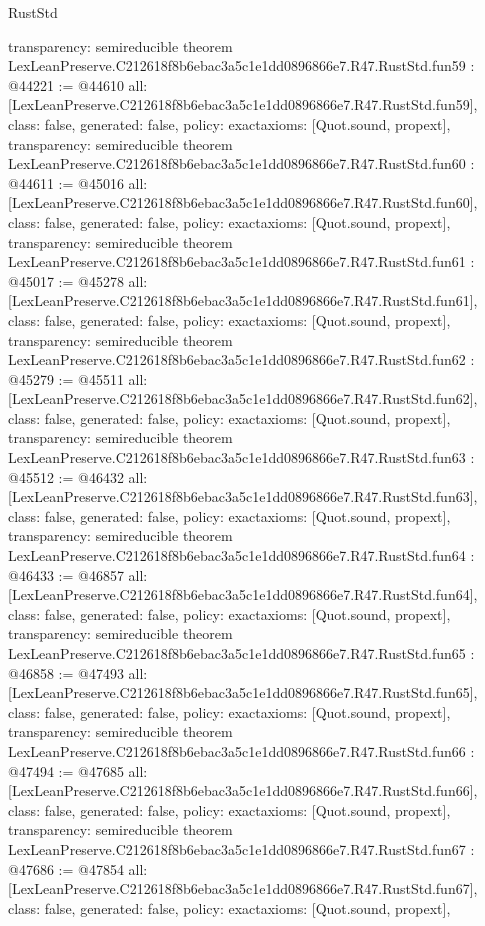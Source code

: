 \begin{lexlean}{RustStd}
\begin{coremodule}
{  transparency: semireducible
}
theorem LexLeanPreserve.C212618f8b6ebac3a5c1e1dd0896866e7.R47.RustStd.fun59 : @44221 := @44610 {
  all: [LexLeanPreserve.C212618f8b6ebac3a5c1e1dd0896866e7.R47.RustStd.fun59],
  class: false,
  generated: false,
  policy: exact{axioms: [Quot.sound, propext]},
  transparency: semireducible
}
theorem LexLeanPreserve.C212618f8b6ebac3a5c1e1dd0896866e7.R47.RustStd.fun60 : @44611 := @45016 {
  all: [LexLeanPreserve.C212618f8b6ebac3a5c1e1dd0896866e7.R47.RustStd.fun60],
  class: false,
  generated: false,
  policy: exact{axioms: [Quot.sound, propext]},
  transparency: semireducible
}
theorem LexLeanPreserve.C212618f8b6ebac3a5c1e1dd0896866e7.R47.RustStd.fun61 : @45017 := @45278 {
  all: [LexLeanPreserve.C212618f8b6ebac3a5c1e1dd0896866e7.R47.RustStd.fun61],
  class: false,
  generated: false,
  policy: exact{axioms: [Quot.sound, propext]},
  transparency: semireducible
}
theorem LexLeanPreserve.C212618f8b6ebac3a5c1e1dd0896866e7.R47.RustStd.fun62 : @45279 := @45511 {
  all: [LexLeanPreserve.C212618f8b6ebac3a5c1e1dd0896866e7.R47.RustStd.fun62],
  class: false,
  generated: false,
  policy: exact{axioms: [Quot.sound, propext]},
  transparency: semireducible
}
theorem LexLeanPreserve.C212618f8b6ebac3a5c1e1dd0896866e7.R47.RustStd.fun63 : @45512 := @46432 {
  all: [LexLeanPreserve.C212618f8b6ebac3a5c1e1dd0896866e7.R47.RustStd.fun63],
  class: false,
  generated: false,
  policy: exact{axioms: [Quot.sound, propext]},
  transparency: semireducible
}
theorem LexLeanPreserve.C212618f8b6ebac3a5c1e1dd0896866e7.R47.RustStd.fun64 : @46433 := @46857 {
  all: [LexLeanPreserve.C212618f8b6ebac3a5c1e1dd0896866e7.R47.RustStd.fun64],
  class: false,
  generated: false,
  policy: exact{axioms: [Quot.sound, propext]},
  transparency: semireducible
}
theorem LexLeanPreserve.C212618f8b6ebac3a5c1e1dd0896866e7.R47.RustStd.fun65 : @46858 := @47493 {
  all: [LexLeanPreserve.C212618f8b6ebac3a5c1e1dd0896866e7.R47.RustStd.fun65],
  class: false,
  generated: false,
  policy: exact{axioms: [Quot.sound, propext]},
  transparency: semireducible
}
theorem LexLeanPreserve.C212618f8b6ebac3a5c1e1dd0896866e7.R47.RustStd.fun66 : @47494 := @47685 {
  all: [LexLeanPreserve.C212618f8b6ebac3a5c1e1dd0896866e7.R47.RustStd.fun66],
  class: false,
  generated: false,
  policy: exact{axioms: [Quot.sound, propext]},
  transparency: semireducible
}
theorem LexLeanPreserve.C212618f8b6ebac3a5c1e1dd0896866e7.R47.RustStd.fun67 : @47686 := @47854 {
  all: [LexLeanPreserve.C212618f8b6ebac3a5c1e1dd0896866e7.R47.RustStd.fun67],
  class: false,
  generated: false,
  policy: exact{axioms: [Quot.sound, propext]},
}
\end{coremodule}
\end{lexlean}
